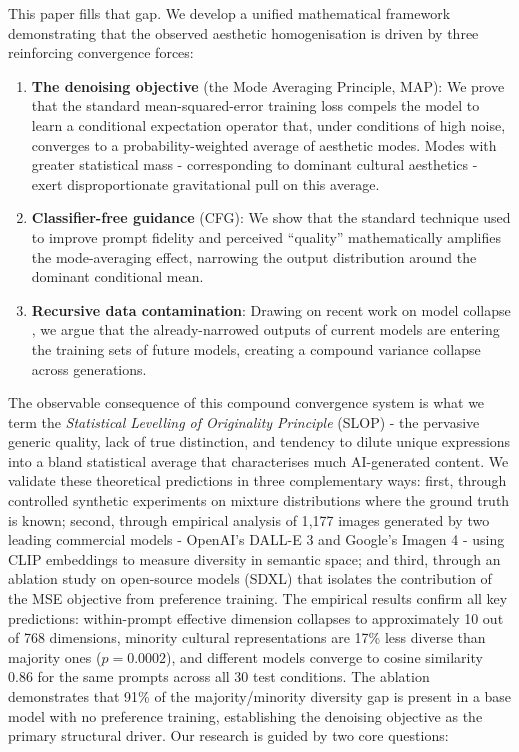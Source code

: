 \documentclass[11pt]{article}
\begin{document}
This paper fills that gap. We develop a unified mathematical framework demonstrating that the observed aesthetic homogenisation is driven by three reinforcing convergence forces:

\begin{enumerate}
 \item \textbf{The denoising objective} (the Mode Averaging Principle, MAP): We prove that the standard mean-squared-error training loss compels the model to learn a conditional expectation operator that, under conditions of high noise, converges to a probability-weighted average of aesthetic modes. Modes with greater statistical mass - corresponding to dominant cultural aesthetics - exert disproportionate gravitational pull on this average.

 \item \textbf{Classifier-free guidance} (CFG): We show that the standard technique used to improve prompt fidelity and perceived ``quality'' \citep{Ho2022} mathematically amplifies the mode-averaging effect, narrowing the output distribution around the dominant conditional mean.

 \item \textbf{Recursive data contamination}: Drawing on recent work on model collapse \citep{Shumailov2024, Alemohammad2023}, we argue that the already-narrowed outputs of current models are entering the training sets of future models, creating a compound variance collapse across generations.
\end{enumerate}

The observable consequence of this compound convergence system is what we term the \textit{Statistical Levelling of Originality Principle} (SLOP) - the pervasive generic quality, lack of true distinction, and tendency to dilute unique expressions into a bland statistical average that characterises much AI-generated content. We validate these theoretical predictions in three complementary ways: first, through controlled synthetic experiments on mixture distributions where the ground truth is known; second, through empirical analysis of 1{,}177 images generated by two leading commercial models - OpenAI's DALL-E 3 \citep{Betker2023} and Google's Imagen 4 \citep{GoogleImagen2024} - using CLIP embeddings \citep{Radford2021} to measure diversity in semantic space; and third, through an ablation study on open-source models (SDXL) that isolates the contribution of the MSE objective from preference training. The empirical results confirm all key predictions: within-prompt effective dimension collapses to approximately 10 out of 768 dimensions, minority cultural representations are 17\% less diverse than majority ones ($p = 0.0002$), and different models converge to cosine similarity 0.86 for the same prompts across all 30 test conditions. The ablation demonstrates that 91\% of the majority/minority diversity gap is present in a base model with no preference training, establishing the denoising objective as the primary structural driver. Our research is guided by two core questions:
\end{document}
